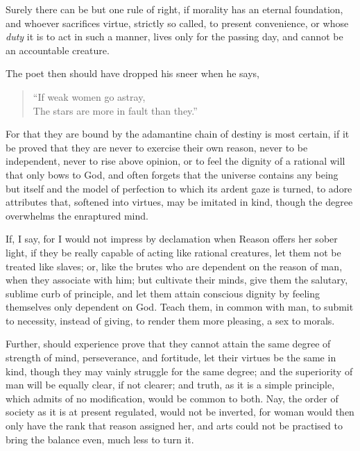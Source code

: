 Surely there can be but one rule of right, if morality has an eternal
foundation, and whoever sacrifices virtue, strictly so called, to
present convenience, or whose \textit{duty} it is to act in such a
manner, lives only for the passing day, and cannot be an accountable
creature.

The poet then should have dropped his sneer when he says,


\begin{verse}
``If weak women go astray,\\
The stars are more in fault than they.''
\end{verse}

\noindent For that they are bound by the adamantine chain of destiny
is most certain, if it be proved that they are never to exercise their
own reason, never to be independent, never to rise  above
opinion, or to feel the dignity of a rational will that only bows to
God, and often forgets that the universe contains any being but itself
and the model of perfection to which its ardent gaze is turned, to
adore attributes that, softened into virtues, may be imitated in kind,
though the degree overwhelms the enraptured mind.

If, I say, for I would not impress by declamation when Reason offers
her sober light, if they be really capable of acting like rational
creatures, let them not be treated like slaves; or, like the brutes
who are dependent on the reason of man, when they associate with him;
but cultivate their minds, give them the salutary, sublime curb of
principle, and let them attain conscious dignity by feeling themselves
only dependent on God. Teach them, in common with man, to submit to
necessity, instead of giving, to render them more pleasing, a sex to
morals.


Further, should experience prove that they cannot attain the same
degree of \linebreak[4] strength of mind, perseverance, and fortitude,
let their virtues be the same in kind, though they may vainly struggle
for the same degree; and the superiority of man will be equally clear,
if not  clearer; and truth, as it is a simple principle,
which admits of no modification, would be common to both. Nay, the
order of society as it is at present regulated, would not be inverted,
for woman would then only have the rank that reason assigned her, and
arts could not be practised to bring the balance even, much less to
turn it.

